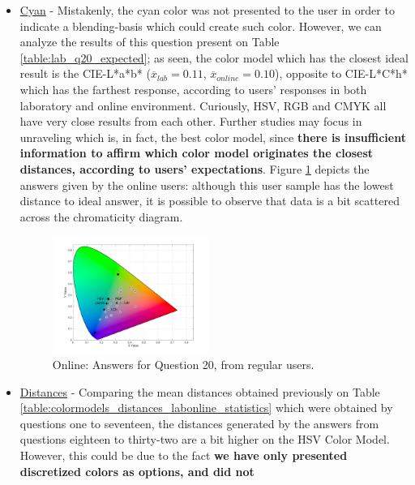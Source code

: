 \begin{itemize}
  \setlength\itemsep{0.01em}
  \item \ul{Cyan} - Mistakenly, the cyan color was not presented to the user in order to indicate a blending-basis which could create such color. However, we can analyze the results of
  this question present on Table \ref{table:lab_q20_expected}; as seen, the color model which has the closest ideal result is the CIE-L*a*b* ($\overline{x}_{lab} = 0.11$, $\overline{x}_{online} = 0.10$), opposite
  to CIE-L*C*h* which has the farthest response, according to users' responses in both laboratory and online environment. Curiously, HSV, RGB and CMYK all have very close results from each other. Further
  studies may focus in unraveling which is, in fact, the best color model, since \textbf{there is insufficient information to affirm which color model originates the closest distances, according to users'
  expectations}. Figure \ref{fig:onlineregular_20} depicts the answers given by the online users: although this user sample has the lowest distance to ideal answer, it is possible to observe that data is
  a bit scattered across the chromaticity diagram.
  \begin{figure}[!htbp]
    \centering
    \vspace{-10pt}
    \includegraphics[width=0.48\textwidth]{images/results/20_online_regularUsers.png}
    \caption[Online: Answers for Question 20, from regular users.]{Online: Answers for Question 20, from regular users.}
    \vspace{-15pt}
    \label{fig:onlineregular_20}
  \end{figure}
  \item \ul{Distances} - Comparing the mean distances obtained previously on Table \ref{table:colormodels_distances_labonline_statistics} which were obtained by questions one to seventeen, the distances generated
  by the answers from questions eighteen to thirty-two are a bit higher on the HSV Color Model. However, this could be due to the fact \textbf{we have only presented discretized colors as options, and did not
}
\end{itemize}

